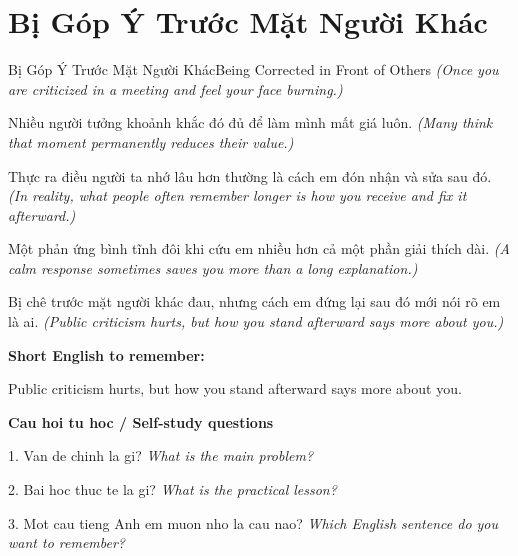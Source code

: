 \section{Bị Góp Ý Trước Mặt Người Khác}
\begin{truyen}{Bị Góp Ý Trước Mặt Người Khác}{Being Corrected in Front of Others}
\textit{(Once you are criticized in a meeting and feel your face burning.)}

Nhiều người tưởng khoảnh khắc đó đủ để làm mình mất giá luôn.
\textit{(Many think that moment permanently reduces their value.)}

Thực ra điều người ta nhớ lâu hơn thường là cách em đón nhận và sửa sau đó.
\textit{(In reality, what people often remember longer is how you receive and fix it afterward.)}

Một phản ứng bình tĩnh đôi khi cứu em nhiều hơn cả một phần giải thích dài.
\textit{(A calm response sometimes saves you more than a long explanation.)}

\end{truyen}

\begin{baihoc}
Bị chê trước mặt người khác đau, nhưng cách em đứng lại sau đó mới nói rõ em là ai.
\textit{(Public criticism hurts, but how you stand afterward says more about you.)}
\end{baihoc}

\begin{ghinhoanh}
\textbf{Short English to remember:}

Public criticism hurts, but how you stand afterward says more about you.

\end{ghinhoanh}

\begin{tuhocnhanh}
\textbf{Cau hoi tu hoc / Self-study questions}

1. Van de chinh la gi? \textit{What is the main problem?}

2. Bai hoc thuc te la gi? \textit{What is the practical lesson?}

3. Mot cau tieng Anh em muon nho la cau nao? \textit{Which English sentence do you want to remember?}
\end{tuhocnhanh}
\ngancach

